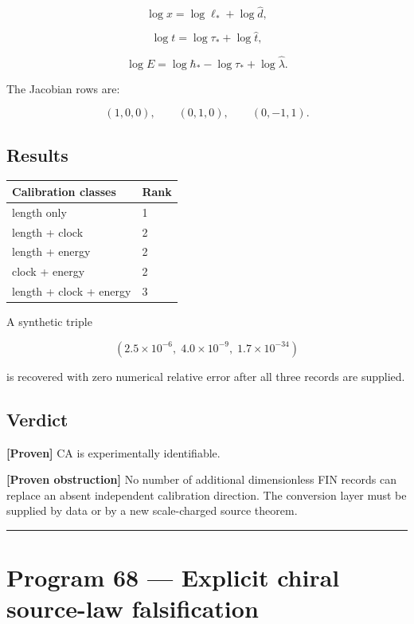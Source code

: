 \documentclass[11pt,a4paper,openany]{report}
\newcommand{\statusProven}{\textcolor{fingreen}{[Proven]}}
\begin{document}
\[
\log x=\log\ell_*+\log\widehat d,
\]

\[
\log t=\log\tau_*+\log\widehat t,
\]

\[
\log E=\log\hbar_*-\log\tau_*+\log\widehat\lambda.
\]

The Jacobian rows are:

\[
(1,0,0),\qquad
(0,1,0),\qquad
(0,-1,1).
\]

\section{Results}

\begin{center}
\begingroup\small
\setlength{\tabcolsep}{3.5pt}
\renewcommand{\arraystretch}{1.16}
\begin{longtable}{@{}p{}p{}@{}}
\toprule
\textbf{Calibration classes} & \textbf{Rank} \\
\midrule
\endhead
length only & 1 \\
length + clock & 2 \\
length + energy & 2 \\
clock + energy & 2 \\
length + clock + energy & 3 \\
\bottomrule
\end{longtable}
\endgroup
\end{center}

A synthetic triple

\[
(2.5\times10^{-6},\;4.0\times10^{-9},\;1.7\times10^{-34})
\]

is recovered with zero numerical relative error after all three records are supplied.

\section{Verdict}

\textbf{\statusProven{}} CA is experimentally identifiable.

\textbf{[Proven obstruction]} No number of additional dimensionless FIN records can replace an absent independent calibration direction. The conversion layer must be supplied by data or by a new scale-charged source theorem.

\par\medskip\hrule\medskip

\chapter{Program 68 — Explicit chiral source-law falsification}
\end{document}
